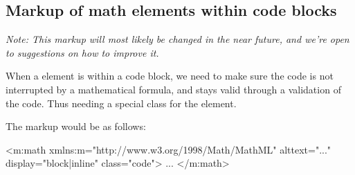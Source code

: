 \documentclass[english,a4paper,11pt]{article}
\begin{document}
\subsection{Markup of math elements within code blocks}

\textit{Note: This markup will most likely be changed in the near future, and we're open to suggestions on how to improve it.}

When a  element is within a code block, we need to make sure the code is not interrupted by a mathematical formula, and stays valid through a validation of the code. Thus needing a special class for the  element.

\begin{eksempler}
The markup would be as follows:
\begin{kodeblokk}
\begin{verbatimtab}[3]
	<m:math 
	    xmlns:m="http://www.w3.org/1998/Math/MathML"
	    alttext="..."
	    display="block|inline"
		class="code">
		...
	</m:math>
\end{verbatimtab}
\end{kodeblokk}
\end{eksempler}
\end{document}
